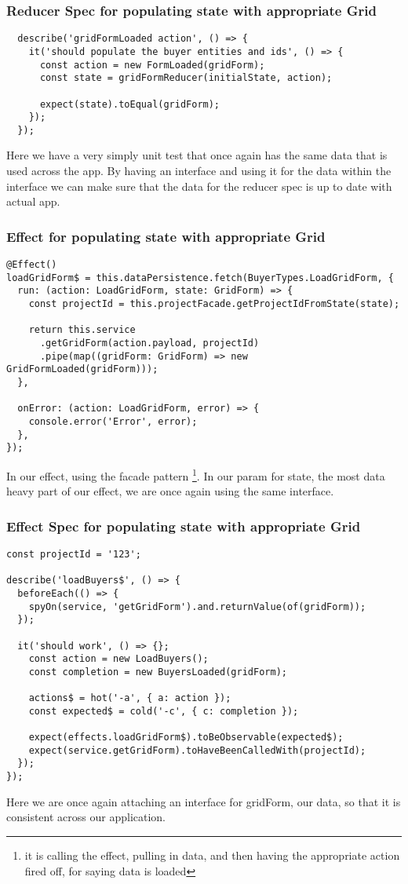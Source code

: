 \subsubsection{ Reducer Spec for populating state with appropriate Grid }
\begin{lstlisting}
  describe('gridFormLoaded action', () => {
    it('should populate the buyer entities and ids', () => {
      const action = new FormLoaded(gridForm);
      const state = gridFormReducer(initialState, action);

      expect(state).toEqual(gridForm);
    });
  });
\end{lstlisting}

Here we have a very simply unit test that once again has the same data that is
used across the app. By having an interface and using it for the data within the
interface we can make sure that the data for the reducer spec is up to date with
actual app.

\subsubsection{ Effect for populating state with appropriate Grid }
\begin{lstlisting}
@Effect()
loadGridForm$ = this.dataPersistence.fetch(BuyerTypes.LoadGridForm, {
  run: (action: LoadGridForm, state: GridForm) => {
    const projectId = this.projectFacade.getProjectIdFromState(state);

    return this.service
      .getGridForm(action.payload, projectId)
      .pipe(map((gridForm: GridForm) => new GridFormLoaded(gridForm)));
  },

  onError: (action: LoadGridForm, error) => {
    console.error('Error', error);
  },
});
\end{lstlisting}

In our effect, using the facade pattern \footnote{it is calling the effect,
pulling in data, and then having the appropriate action fired off, for saying
data is loaded}. In our param for state, the most data heavy part of our effect,
we are once again using the same interface.

\subsubsection{ Effect Spec for populating state with appropriate Grid }
\begin{lstlisting}
const projectId = '123';

describe('loadBuyers$', () => {
  beforeEach(() => {
    spyOn(service, 'getGridForm').and.returnValue(of(gridForm));
  });

  it('should work', () => {};
    const action = new LoadBuyers();
    const completion = new BuyersLoaded(gridForm);

    actions$ = hot('-a', { a: action });
    const expected$ = cold('-c', { c: completion });

    expect(effects.loadGridForm$).toBeObservable(expected$);
    expect(service.getGridForm).toHaveBeenCalledWith(projectId);
  });
});
\end{lstlisting}

Here we are once again attaching an interface for gridForm, our data, so that it
is consistent across our application.
